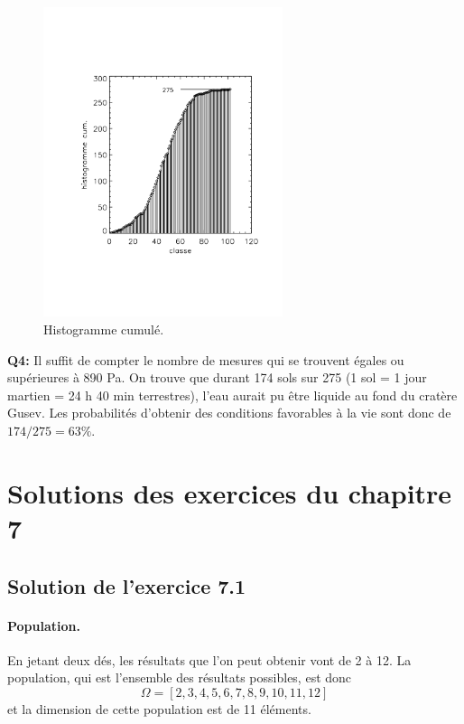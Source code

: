 \begin{figure}
   \centering
   \vspace{-5mm}
   \includegraphics[width=7cm]{assets/figures/Serie1_exe3_histCumulated.pdf}
   \caption{Histogramme cumulé.}
   \label{fig:ch}
\end{figure}
\textbf{Q4:} Il suffit de compter le nombre de mesures qui se trouvent égales ou supérieures à 890 Pa. On trouve que durant 174 sols sur 275 (1 sol = 1 jour martien = 24 h 40 min terrestres), l'eau aurait pu être liquide au fond du cratère Gusev. Les probabilités d'obtenir des conditions favorables à la vie sont donc de $174/275=63\%$.

\section{Solutions des exercices du chapitre 7}

\subsection*{Solution de l'exercice 7.1}

\paragraph{Population.} En jetant deux dés, les résultats que l'on peut obtenir vont de 2 à 12. La population, qui est l'ensemble des résultats possibles, est donc
$$
\Omega=[2,3,4,5,6,7,8,9,10,11,12]
$$
et la dimension de cette population est de 11 éléments.

